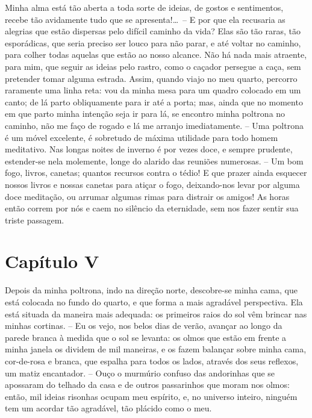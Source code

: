  Minha alma está tão aberta a toda sorte de ideias, de gostos e
sentimentos, recebe tão avidamente tudo que se apresenta!\ldots\ -- E por
que ela recusaria as alegrias que estão dispersas pelo difícil caminho
da vida? Elas são tão raras, tão esporádicas, que seria preciso ser
louco para não parar, e até voltar no caminho, para colher todas
aquelas que estão ao nosso alcance. Não há nada mais atraente, para
mim, que seguir as ideias pelo rastro, como o caçador persegue a caça,
sem pretender tomar alguma estrada. Assim, quando viajo no meu quarto,
percorro raramente uma linha reta: vou da minha mesa para um quadro
colocado em um canto; de lá parto obliquamente para ir até a porta;
mas, ainda que no momento em que parto minha intenção seja ir para lá,
se encontro minha poltrona no caminho, não me faço de rogado e lá me
arranjo imediatamente. -- Uma poltrona é um móvel excelente, é
sobretudo de máxima utilidade para todo homem meditativo. Nas longas
noites de inverno é por vezes doce, e sempre prudente, estender-se nela
molemente, longe do alarido das reuniões numerosas. -- Um bom fogo,
livros, canetas; quantos recursos contra o tédio! E que prazer ainda
esquecer nossos livros e nossas canetas para atiçar o fogo,
deixando-nos levar por alguma doce meditação, ou arrumar algumas rimas
para distrair os amigos! As horas então correm por nós e caem no
silêncio da eternidade, sem nos fazer sentir sua triste passagem. 

\section{Capítulo V}

 Depois da minha poltrona, indo na direção norte, descobre-se minha
cama, que está colocada no fundo do quarto, e que forma a mais
agradável perspectiva. Ela está situada da maneira mais adequada: os
primeiros raios do sol vêm brincar nas minhas cortinas. -- Eu os vejo,
nos belos dias de verão, avançar ao longo da parede branca à medida que
o sol se levanta: os olmos que estão em frente a minha janela os
dividem de mil maneiras, e os fazem balançar sobre minha cama,
cor-de-rosa e branca, que espalha para todos os lados, através dos seus
reflexos, um matiz encantador. -- Ouço o murmúrio confuso das
andorinhas que se apossaram do telhado da casa e de outros passarinhos
que moram nos olmos: então, mil ideias risonhas ocupam meu espírito, e,
no universo inteiro, ninguém tem um acordar tão agradável, tão plácido
como o meu.

